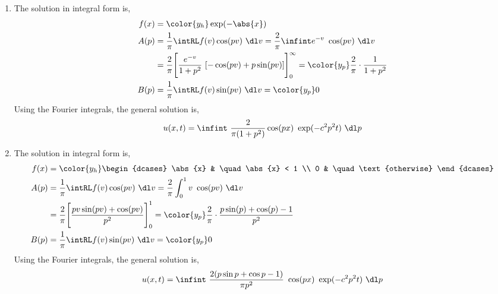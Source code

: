 \begin{enumerate}
    \item The solution in integral form is,
          \begin{align}
              f(x) & = \color{y_h} \exp(-\abs{x})                               \\
              A(p) & = \frac{1}{\pi} \intRL f(v) \cos(pv)\ \dl v
              = \frac{2}{\pi} \infint e^{-v}\ \cos(pv)\ \dl v                   \\
                   & = \frac{2}{\pi} \Bigg[\frac{e^{-v}}{1 + p^2}\ [-\cos(pv) +
              p\sin(pv)]\Bigg]_0^\infty
              = \color{y_p} \frac{2}{\pi} \cdot \frac{1}{1 + p^2}               \\
              B(p) & = \frac{1}{\pi} \intRL f(v) \sin(pv)\ \dl v
              = \color{y_p} 0
          \end{align}
          Using the Fourier integrals, the general solution is,
          \begin{align}
              u(x, t) = \infint\ \frac{2}{\pi (1 + p^2)}\cos(px)
              \ \exp(-c^2p^2 t)\ \dl p
          \end{align}

    \item The solution in integral form is,
          \begin{align}
              f(x) & = \color{y_h} \begin{dcases}
                                       \abs{x} & \quad \abs{x} < 1      \\
                                       0       & \quad \text{otherwise}
                                   \end{dcases}          \\
              A(p) & = \frac{1}{\pi} \intRL f(v) \cos(pv)\ \dl v
              = \frac{2}{\pi} \int_{0}^{1} v\ \cos(pv)\ \dl v                \\
                   & = \frac{2}{\pi} \Bigg[\frac{pv\sin(pv) + \cos(pv)}{p^2}
                  \Bigg]_0^1
              = \color{y_p} \frac{2}{\pi} \cdot \frac{p\sin(p) + \cos(p) - 1}
              {p^2}                                                          \\
              B(p) & = \frac{1}{\pi} \intRL f(v) \sin(pv)\ \dl v
              = \color{y_p} 0
          \end{align}
          Using the Fourier integrals, the general solution is,
          \begin{align}
              u(x, t) = \infint\ \frac{2(p\sin p + \cos p - 1)}{\pi p^2}
              \ \cos(px)\ \exp(-c^2p^2 t)\ \dl p
          \end{align}


\end{enumerate}
